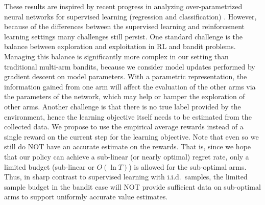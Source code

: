 These results are inspired by recent progress in analyzing over-parametrized neural networks for supervised learning (regression and classification) \citep{li2018learning,du2018gradientA,du2018gradientB,allen2018convergenceA,allen2018convergenceB}. 
However, because of the differences between the supervised learning and reinforcement learning settings many challenges still persist. 
One standard challenge is the balance between exploration and exploitation in RL and bandit problems.
Managing this balance is significantly more complex in our setting than traditional multi-arm bandits, because we consider model updates performed by gradient descent on model parameters.
With a parametric representation,
the information gained from one arm will affect the evaluation of the other arms via the parameters of the network, which may help or hamper the exploration of other arms.
Another challenge is that there is no true label provided by the environment, hence the learning objective itself needs to be estimated from the collected data.
We propose to use the empirical average rewards instead of a single reward on the current step for the learning objective. 
Note that even so we still do NOT have an accurate estimate on the rewards.
That is, since we hope that our policy can achieve a sub-linear (or nearly optimal) regret rate, only a limited budget (sub-linear or $O(\ln T )$) is allowed for the sub-optimal arms.  Thus, in sharp contrast to supervised learning with i.i.d.\ samples, the limited sample budget in the bandit case will NOT provide sufficient data on sub-optimal arms to support uniformly accurate value estimates.



